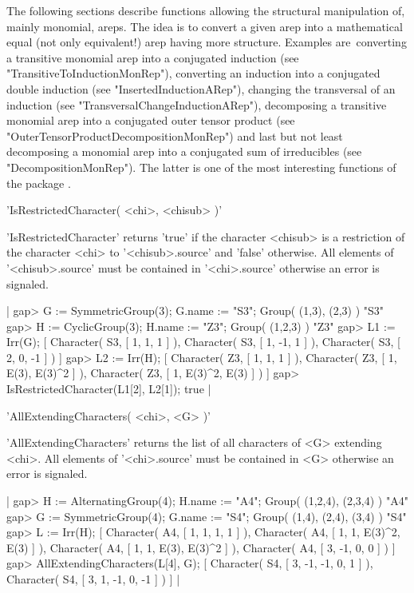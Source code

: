 The following sections describe functions allowing the
structural manipulation of, mainly monomial, areps. The idea is 
to convert a given arep into a mathematical equal (not only equivalent!)
arep having more structure. 
Examples are\:\ converting a transitive monomial arep into 
a conjugated induction (see "TransitiveToInductionMonRep"), 
converting an induction into a conjugated
double induction (see "InsertedInductionARep"), 
changing the transversal of an induction
(see "TransversalChangeInductionARep"), 
decomposing a transitive monomial arep into a conjugated 
outer tensor product 
(see "OuterTensorProductDecompositionMonRep") 
and last but not least decomposing a monomial arep into a 
conjugated sum of irreducibles
(see "DecompositionMonRep").
The latter is one of the most interesting functions
of the package {\AREP}.

'IsRestrictedCharacter( <chi>, <chisub> )'

'IsRestrictedCharacter' returns 'true' if the character <chisub> 
is a restriction of the character <chi> to '<chisub>.source' and 
'false' otherwise. All elements of '<chisub>.source' must be 
contained in '<chi>.source' otherwise an error is signaled.

|    gap> G := SymmetricGroup(3); G.name := "S3";
    Group( (1,3), (2,3) )
    "S3"
    gap> H := CyclicGroup(3); H.name := "Z3";
    Group( (1,2,3) )
    "Z3"
    gap> L1 := Irr(G);
    [ Character( S3, [ 1, 1, 1 ] ), Character( S3, [ 1, -1, 1 ] ), 
      Character( S3, [ 2, 0, -1 ] ) ]
    gap> L2 := Irr(H);
    [ Character( Z3, [ 1, 1, 1 ] ), Character( Z3, [ 1, E(3), E(3)^2 ] ), 
      Character( Z3, [ 1, E(3)^2, E(3) ] ) ]
    gap> IsRestrictedCharacter(L1[2], L2[1]);
    true |


'AllExtendingCharacters( <chi>, <G> )'

'AllExtendingCharacters' returns the list of all characters 
of <G> extending <chi>. All elements of '<chi>.source' must be 
contained in <G> otherwise an error is signaled.

|    gap> H := AlternatingGroup(4); H.name := "A4";
    Group( (1,2,4), (2,3,4) )
    "A4"
    gap> G := SymmetricGroup(4); G.name := "S4";
    Group( (1,4), (2,4), (3,4) )
    "S4"
    gap> L := Irr(H);
    [ Character( A4, [ 1, 1, 1, 1 ] ), 
      Character( A4, [ 1, 1, E(3)^2, E(3) ] ), 
      Character( A4, [ 1, 1, E(3), E(3)^2 ] ), 
      Character( A4, [ 3, -1, 0, 0 ] ) ]
    gap> AllExtendingCharacters(L[4], G);
    [ Character( S4, [ 3, -1, -1, 0, 1 ] ), 
      Character( S4, [ 3, 1, -1, 0, -1 ] ) ] |

